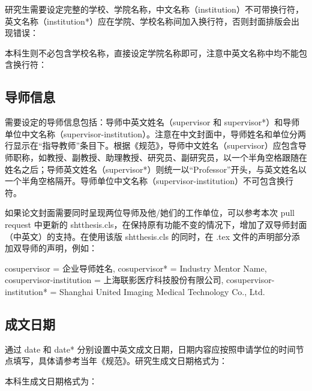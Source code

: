 \documentclass[master]{shtthesis}
\begin{document}
研究生需要设定完整的学校、学院名称，中文名称（institution）不可带换行符，英文名称（institution*）应在学院、学校名称间加入换行符，否则封面排版会出现错误：
\begin{latex}
\end{latex}
本科生则不必包含学校名称，直接设定学院名称即可，注意中英文名称中均不能包含换行符：
\begin{latex}
\end{latex}

\subsection{导师信息}
需要设定的导师信息包括：导师中英文姓名（supervisor 和 supervisor*）和导师单位中文名称（supervisor-institution）。注意在中文封面中，导师姓名和单位分两行显示在“指导教师”条目下。根据《规范》，导师中文姓名（supervisor）应包含导师职称，如教授、副教授、助理教授、研究员、副研究员，以一个半角空格跟随在姓名之后；导师英文姓名（supervisor*）则统一以“Professor”开头，与英文姓名以一个半角空格隔开。导师单位中文名称（supervisor-institution）不可包含换行符。
\begin{latex}
\end{latex}

如果论文封面需要同时呈现两位导师及他/她们的工作单位，可以参考本次 pull request 中更新的 shtthesis.cls，在保持原有功能不变的情况下，增加了双导师封面（中英文）的支持。在使用该版 shtthesis.cls 的同时，在 .tex 文件的声明部分添加双导师的声明，例如：

\begin{latex}
  cosupervisor = {企业导师姓名}, 
  cosupervisor* = {Industry Mentor Name},
  cosupervisor-institution = {上海联影医疗科技股份有限公司},
  cosupervisor-institution* = {Shanghai United Imaging Medical Technology Co., Ltd.}
\end{latex}

\subsection{成文日期}
通过 date 和 date* 分别设置中英文成文日期，日期内容应按照申请学位的时间节点填写，具体请参考当年《规范》。研究生成文日期格式为：
\begin{latex}
\end{latex}
本科生成文日期格式为：
\begin{latex}
\end{latex}
\end{document}
